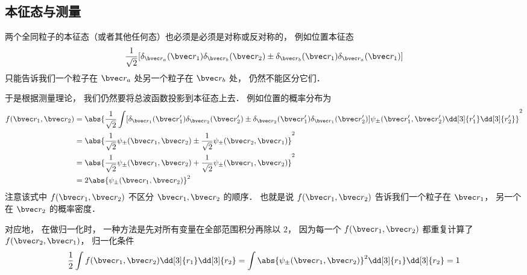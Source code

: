 


\subsection{本征态与测量}
两个全同粒子的本征态（或者其他任何态）也必须是必须是对称或反对称的， 例如位置本征态
$$\frac{1}{\sqrt 2}[\delta_{\bvec r_a}(\bvec r_1) \delta_{\bvec r_b}(\bvec r_2)\pm \delta_{\bvec r_b}(\bvec r_1) \delta_{\bvec r_a}(\bvec r_1)]$$
只能告诉我们一个粒子在 $\bvec r_a$ 处另一个粒子在 $\bvec r_b$ 处， 仍然不能区分它们．

于是根据测量理论， 我们仍然要将总波函数投影到本征态上去． 例如位置的概率分布为
\begin{equation}\label{IdPar_eq1}
\begin{aligned}
f(\bvec r_1, \bvec r_2) &= \abs{\frac{1}{\sqrt{2}}\int [\delta_{\bvec r_1}(\bvec r'_1) \delta_{\bvec r_2}(\bvec r'_2) \pm \delta_{\bvec r_2}(\bvec r'_1) \delta_{\bvec r_1}(\bvec r'_2)] \psi_\pm(\bvec r'_1,\bvec r'_2) \dd[3]{r'_1}\dd[3]{r'_2}}^2\\
&= \abs{\frac{1}{\sqrt{2}} \psi_\pm(\bvec r_1, \bvec r_2) \pm  \frac{1}{\sqrt{2}} \psi_\pm(\bvec r_2, \bvec r_1)}^2\\
&= \abs{\frac{1}{\sqrt{2}} \psi_\pm(\bvec r_1, \bvec r_2) +  \frac{1}{\sqrt{2}} \psi_\pm(\bvec r_1, \bvec r_2)}^2\\
&= 2\abs{\psi_\pm(\bvec r_1, \bvec r_2)}^2
\end{aligned}
\end{equation}
注意该式中 $f(\bvec r_1, \bvec r_2)$ 不区分 $\bvec r_1, \bvec r_2$ 的顺序． 也就是说 $f(\bvec r_1, \bvec r_2)$ 告诉我们一个粒子在 $\bvec r_1$， 另一个在 $\bvec r_2$ 的概率密度．

对应地， 在做归一化时， 一种方法是先对所有变量在全部范围积分再除以 $2$， 因为每一个 $f(\bvec r_1, \bvec r_2)$ 都重复计算了 $f(\bvec r_2, \bvec r_1)$， 归一化条件
\begin{equation}\label{IdPar_eq2}
\frac{1}{2}\int f(\bvec r_1, \bvec r_2) \dd[3]{r_1}\dd[3]{r_2} = \int \abs{\psi_\pm(\bvec r_1, \bvec r_2)}^2 \dd[3]{r_1}\dd[3]{r_2} = 1
\end{equation}

